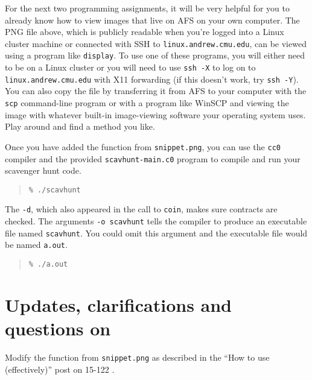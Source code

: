 \documentclass[12pt]{exam}
\begin{document}
For the next two programming assignments, it will be very helpful for
you to already know how to view images that live on AFS on your own
computer.  The PNG file above, which is publicly readable when you're
logged into a Linux cluster machine or connected with SSH to
\lstinline'linux.andrew.cmu.edu', can be viewed using a program like
\lstinline'display'.
To use one of these programs, you will either need to be on a Linux
cluster or you will need to use \lstinline'ssh -X' to log on to
\lstinline'linux.andrew.cmu.edu' with X11 forwarding (if this doesn't
work, try \lstinline'ssh -Y').  You can also copy the file by
transferring it from AFS to your computer with the \lstinline'scp'
command-line program or with a program like WinSCP and viewing the
image with whatever built-in image-viewing software your operating
system uses.  Play around and find a method you like.

Once you have added the function from \lstinline'snippet.png', you can use
the \lstinline'cc0' compiler and the provided \lstinline'scavhunt-main.c0'
program to compile and run your scavenger hunt code.

\begin{quote}
\begin{lstlisting}[language={[coin]C}]
% cc0 -d -o scavhunt scavhunt.c0 scavhunt-main.c0
% ./scavhunt
\end{lstlisting}
\end{quote}

The \lstinline'-d', which also appeared in the call to
\lstinline'coin', makes sure contracts are checked. The arguments
\lstinline'-o scavhunt' tells the compiler to produce an executable
file named \lstinline'scavhunt'. You could omit this argument and the
executable file would be named \lstinline'a.out'.

\begin{quote}
\begin{lstlisting}[language={[coin]C}]
% cc0 -d scavhunt.c0 scavhunt-main.c0
% ./a.out
\end{lstlisting}
\end{quote}


\section{Updates, clarifications and questions on \qatoolName}

\vspace{-\bigskipamount}
\begin{task}[3]
Modify the function from \lstinline'snippet.png' as described in the
``How to use \qatoolName{} (effectively)'' post on 15-122 \qatoolName.
\end{task}
\end{document}

